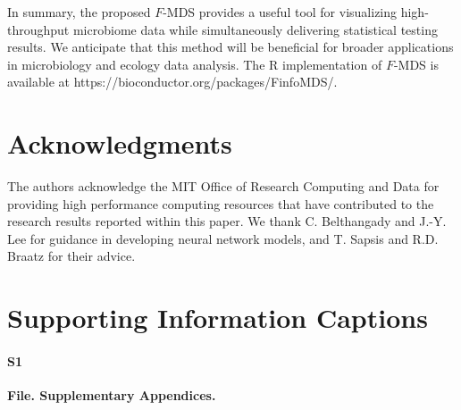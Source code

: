 \documentclass[10pt,letterpaper]{article}
\newcommand{\1}{{\rm 1}\kern-0.24em{\rm I}}
\begin{document}
In summary, the proposed $F$-MDS provides a useful tool for visualizing high-throughput microbiome data while simultaneously delivering statistical testing results. We anticipate that this method will be beneficial for broader applications in microbiology and ecology data analysis. The R implementation of $F$-MDS is available at https://bioconductor.org/packages/FinfoMDS/.



\section*{Acknowledgments}
The authors acknowledge the MIT Office of Research Computing and Data for providing high performance computing resources that have contributed to the research results reported within this paper. We thank C. Belthangady and J.-Y. Lee for guidance in developing neural network models, and T. Sapsis and R.D. Braatz for their advice.


\nolinenumbers




\section*{Supporting Information Captions}

\paragraph*{S1}\hspace{-2ex}
\label{SI}
{\bf File. Supplementary Appendices.}


\end{document}

